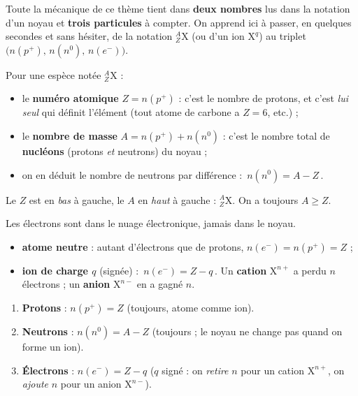 \documentclass[11pt,a4paper]{article}
\begin{document}

Toute la mécanique de ce thème tient dans \textbf{deux nombres} lus dans la notation d'un noyau
et \textbf{trois particules} à compter. On apprend ici à passer, en quelques secondes et sans hésiter,
de la notation $^{A}_{Z}\mathrm{X}$ (ou d'un ion $\mathrm{X}^{q}$) au triplet
$\big(n(p^+),\,n(n^0),\,n(e^-)\big)$.

\begin{cle}
Pour une espèce notée $^{A}_{Z}\mathrm{X}$ :
\begin{itemize}[leftmargin=1.5em,topsep=2pt,itemsep=1pt]
  \item le \textbf{numéro atomique} $Z = n(p^+)$ : c'est le nombre de protons, et c'est \emph{lui seul}
        qui définit l'élément (tout atome de carbone a $Z=6$, etc.) ;
  \item le \textbf{nombre de masse} $A = n(p^+) + n(n^0)$ : c'est le nombre total de \textbf{nucléons}
        (protons \emph{et} neutrons) du noyau ;
  \item on en déduit le nombre de neutrons par différence : $\boxed{\,n(n^0) = A - Z\,}$.
\end{itemize}
Le $Z$ est en \emph{bas} à gauche, le $A$ en \emph{haut} à gauche : $^{A}_{Z}\mathrm{X}$. On a toujours
$A \ge Z$.
\end{cle}

\begin{cle}
Les électrons sont dans le nuage électronique, jamais dans le noyau.
\begin{itemize}[leftmargin=1.5em,topsep=2pt,itemsep=1pt]
  \item \textbf{atome neutre} : autant d'électrons que de protons, $n(e^-) = n(p^+) = Z$ ;
  \item \textbf{ion de charge $q$} (signée) : $\boxed{\,n(e^-) = Z - q\,}$. Un \textbf{cation}
        $\mathrm{X}^{n+}$ a perdu $n$ électrons ; un \textbf{anion} $\mathrm{X}^{n-}$ en a gagné $n$.
\end{itemize}
\end{cle}

\begin{methode}
\begin{enumerate}[leftmargin=1.7em,topsep=2pt,itemsep=1pt]
  \item \textbf{Protons} : $n(p^+) = Z$ \quad(toujours, atome comme ion).
  \item \textbf{Neutrons} : $n(n^0) = A - Z$ \quad(toujours ; le noyau ne change pas quand on forme un ion).
  \item \textbf{Électrons} : $n(e^-) = Z - q$ \quad($q$ signé : on \emph{retire} $n$ pour un cation
        $\mathrm{X}^{n+}$, on \emph{ajoute} $n$ pour un anion $\mathrm{X}^{n-}$).
\end{enumerate}
\end{methode}
\end{document}

